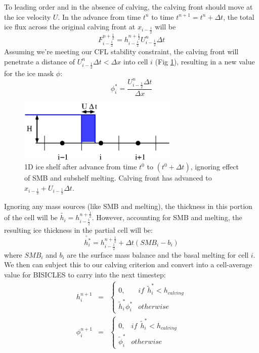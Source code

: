 \documentclass[12pt]{article}
\newcommand{\half}{\frac{1}{2}}
\begin{document}
To leading order and in the absence of calving, the calving front should move at the ice velocity $U$. In the advance from time $t^n$ to time $t^{n+1} = t^n + \Delta t$, the total ice flux across the original calving front at $x_{i-\half}$ will be 
\begin{equation}
F^{n+\half}_{i-\half} = h^{n+\half}_{i-\half} U^{n}_{i-\half} \Delta t 
\label{eqn:flux}
\end{equation}
Assuming we're meeting our CFL stability constraint, the calving front will penetrate a distance of $ U^{n}_{i-\half} \Delta t < \Delta x$ into cell $i$ (Fig \ref{fig:postAdvance1D}), resulting in a new value for the ice mask $\phi$:
\begin{equation}
\phi^{*}_{i} = \frac{ U^{n}_{i-\half} \Delta t}{\Delta x}
\label{eqn:newPhi}
\end{equation}
\begin{figure}
\centerline{
\includegraphics[width=3.0in]{calving2}  
}
\caption{1D ice shelf after advance from time $t^0$ to $(t^0 + \Delta t)$, ignoring effect of SMB and subshelf melting.  Calving front has advanced to $x_{i-\half} + U_{i-\half}\Delta t$.}
\label{fig:postAdvance1D}
\end{figure}
Ignoring any mass sources (like SMB and melting), the thickness in this portion of the cell will be $\tilde{h_i} = h^{n+\half}_{i-\half}$. However, accounting for SMB and melting, the resulting ice thickness in the partial cell will be:
\begin{equation}
\tilde{h^*_i} = h^{n+\half}_{i-\half} + \Delta t (SMB_i - b_i)
\label{eqn:newHStar}
\end{equation}
where $SMB_i$ and $b_i$ are the surface mass balance and the basal melting for cell $i$. We then can subject this to our calving criterion and convert into a cell-average value for BISICLES to carry into the next timestep:
\begin{eqnarray}
h^{n+1}_i & = & \begin{cases}
0, & if \ \  \tilde{h}^*_{i} < h_{calving} \\
 \tilde{h}^*_{i}\phi^{*}_i & otherwise 
\end{cases} 
\label{eqn:calvingLaw} \\
\phi^{n+1}_i & = & \begin{cases}
0, & if \ \  \tilde{h}^*_{i} < h_{calving} \\
 \tilde{\phi}^*_{i} & otherwise \nonumber
\end{cases} 
\end{eqnarray}
\end{document}
